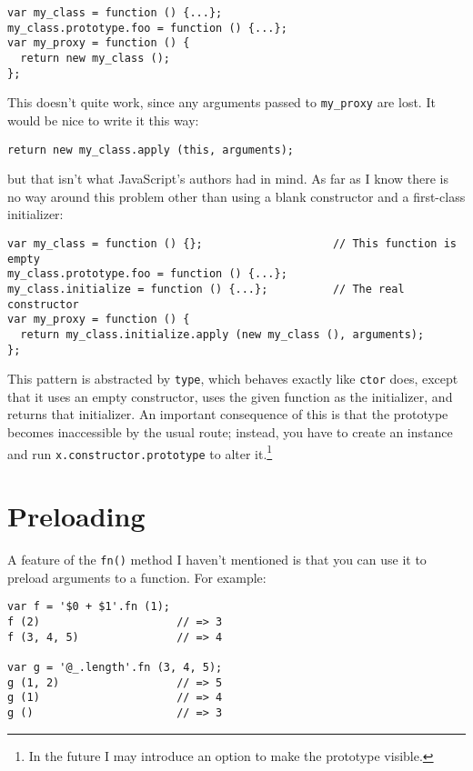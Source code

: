 \documentclass{report}
\begin{document}
\begin{verbatim}
var my_class = function () {...};
my_class.prototype.foo = function () {...};
var my_proxy = function () {
  return new my_class ();
};
\end{verbatim}

      This doesn't quite work, since any arguments passed to \verb|my_proxy| are lost. It would be nice to write it this way:

\begin{verbatim}
return new my_class.apply (this, arguments);
\end{verbatim}

      \noindent but that isn't what JavaScript's authors had in mind. As far as I know there is no way around this problem other than using a blank constructor and a first-class initializer:

\begin{verbatim}
var my_class = function () {};                    // This function is empty
my_class.prototype.foo = function () {...};
my_class.initialize = function () {...};          // The real constructor
var my_proxy = function () {
  return my_class.initialize.apply (new my_class (), arguments);
};
\end{verbatim}

      This pattern is abstracted by \verb|type|, which behaves exactly like \verb|ctor| does, except that it uses an empty constructor, uses the given function as the initializer, and returns
      that initializer. An important consequence of this is that the prototype becomes inaccessible by the usual route; instead, you have to create an instance and run
      \verb|x.constructor.prototype| to alter it.\footnote{In the future I may introduce an option to make the prototype visible.}

\section {Preloading}
      \label{sec:preloading}
      A feature of the \verb|fn()| method I haven't mentioned is that you can use it to preload arguments to a function. For example:

\begin{verbatim}
var f = '$0 + $1'.fn (1);
f (2)                     // => 3
f (3, 4, 5)               // => 4

var g = '@_.length'.fn (3, 4, 5);
g (1, 2)                  // => 5
g (1)                     // => 4
g ()                      // => 3
\end{verbatim}
\end{document}

